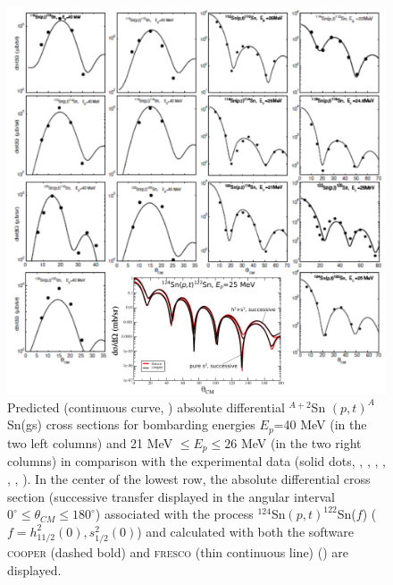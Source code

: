   \begin{figure}
  \centerline{\includegraphics*[width=15cm,angle=0]{C8/figsC8/fig8_2_4}}
  	\caption{Predicted (continuous curve, \cite{Potel:13,Potel:13b}) absolute differential $^{A+2}$Sn $(p,t)^A$Sn(gs) cross sections for bombarding
  	energies $E_p$=40 MeV (in the two left columns) and 21 MeV $\leq E_p \leq 26$ MeV (in the two right columns) in comparison with the
  	experimental data (solid dots, \cite{Bassani:65}, \cite{Guazzoni:99}, \cite{Guazzoni:04}, \cite{Guazzoni:06}, \cite{Guazzoni:08}, \cite{Guazzoni:11}, \cite{Guazzoni:12}). In the center of the lowest row, the absolute differential cross section (successive transfer displayed in the angular interval $0^\circ\leq\theta_{CM}\leq180^\circ$) associated with the process $^{124}$Sn$(p,t)^{122}$Sn($f$) ($f=h_{11/2}^2(0),s_{1/2}^2(0)$) and calculated with both the software \textsc{cooper} (dashed bold) and  \textsc{fresco} (thin continuous line) (\cite{Thompson:88}) are displayed. }\label{fig8_2_4}
  \end{figure}
  



